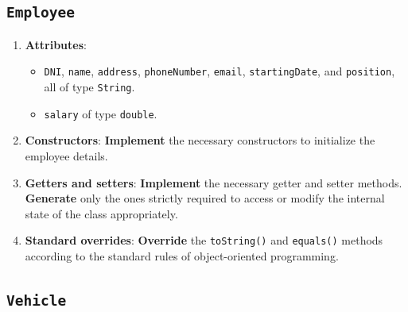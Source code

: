 \subsection{\texttt{Employee}}

\begin{enumerate}

    \item \textbf{Attributes}:

        \begin{itemize}

            \item \texttt{DNI}, \texttt{name}, \texttt{address}, \texttt{phoneNumber}, \texttt{email}, \texttt{startingDate}, and \texttt{position}, all of type \texttt{String}.

            \item \texttt{salary} of type \texttt{double}.

        \end{itemize}

    \item \textbf{Constructors}: \textbf{Implement} the necessary constructors to initialize the employee details.

    \item \textbf{Getters and setters}: \textbf{Implement} the necessary getter and setter methods. \textbf{Generate} only the ones strictly required to access or modify the internal state of the class appropriately.

    \item \textbf{Standard overrides}: \textbf{Override} the \texttt{toString()} and \texttt{equals()} methods according to the standard rules of object-oriented programming.

\end{enumerate}

\subsection{\texttt{Vehicle}}

